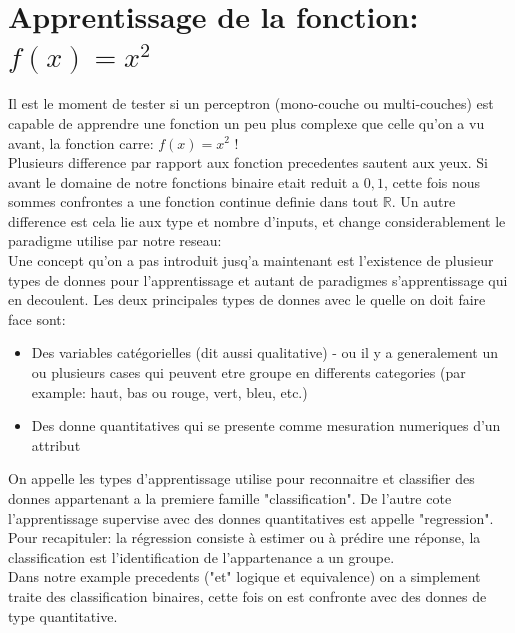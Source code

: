 \documentclass[twoside,openright,a4paper,11pt,french]{article}
\begin{document}
\section{Apprentissage de la fonction: $f(x) = x^2$}

Il est le moment de tester si un perceptron (mono-couche ou multi-couches) est
capable de apprendre une fonction un peu plus complexe que celle qu'on a vu avant, 
la fonction carre: $f(x) = x^2$ !\\

Plusieurs difference par rapport aux fonction precedentes sautent aux yeux.
Si avant le domaine de notre fonctions binaire etait reduit a ${0,1}$, cette
fois nous sommes confrontes a une fonction continue definie dans tout $\mathbb{R}$.
Un autre difference est cela lie aux type et nombre d'inputs, et change
considerablement le paradigme utilise par notre reseau:\\

Une concept qu'on a pas introduit jusq'a maintenant est l'existence de plusieur
types de donnes pour l'apprentissage et autant de paradigmes s'apprentissage qui en
decoulent. Les deux principales types de donnes avec le quelle on doit faire
face sont:

\begin{itemize}
\item Des variables catégorielles (dit aussi qualitative) - ou il y a generalement
      un ou plusieurs cases qui peuvent etre groupe en differents categories 
     (par example: haut, bas ou rouge, vert, bleu, etc.)
\item Des donne quantitatives qui se presente comme mesuration numeriques d'un attribut
\end{itemize}

On appelle les types d'apprentissage utilise pour reconnaitre et classifier des donnes
appartenant a la premiere famille "classification". De l'autre cote l'apprentissage
supervise avec des donnes quantitatives est appelle "regression".\cite{kindsNN}\\

Pour recapituler: la régression consiste à estimer ou à prédire une réponse,
la classification est l'identification de l'appartenance a un groupe.\\

Dans notre example precedents ("et" logique et equivalence) on a simplement
traite des classification binaires, cette fois on est confronte avec des donnes
de type quantitative.
\end{document}
